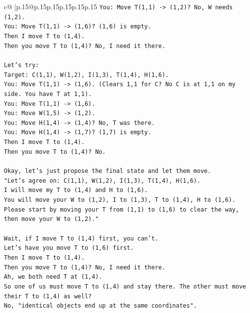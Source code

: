 \documentclass{article}
\begin{document}
{\begin{supertabular}{c@{$\;$}|p{.15\linewidth}@{}p{.15\linewidth}p{.15\linewidth}p{.15\linewidth}p{.15\linewidth}p{.15\linewidth}}
{{{\texttt{You: Move T(1,1) {-}> (1,2)? No, W needs (1,2).} \\
\texttt{You: Move T(1,1) {-}> (1,6)? (1,6) is empty.} \\
\texttt{Then I move T to (1,4).} \\
\texttt{Then you move T to (1,4)? No, I need it there.} \\
\\ 
\texttt{Let's try:} \\
\texttt{Target: C(1,1), W(1,2), I(1,3), T(1,4), H(1,6).} \\
\texttt{You: Move T(1,1) {-}> (1,6). (Clears 1,1 for C? No C is at 1,1 on my side. You have T at 1,1).} \\
\texttt{You: Move T(1,1) {-}> (1,6).} \\
\texttt{You: Move W(1,5) {-}> (1,2).} \\
\texttt{You: Move H(1,4) {-}> (1,4)? No, T was there.} \\
\texttt{You: Move H(1,4) {-}> (1,7)? (1,7) is empty.} \\
\texttt{Then I move T to (1,4).} \\
\texttt{Then you move T to (1,4)? No.} \\
\\ 
\texttt{Okay, let's just propose the final state and let them move.} \\
\texttt{"Let's agree on: C(1,1), W(1,2), I(1,3), T(1,4), H(1,6).} \\
\texttt{I will move my T to (1,4) and H to (1,6).} \\
\texttt{You will move your W to (1,2), I to (1,3), T to (1,4), H to (1,6).} \\
\texttt{Please start by moving your T from (1,1) to (1,6) to clear the way, then move your W to (1,2)."} \\
\\ 
\texttt{Wait, if I move T to (1,4) first, you can't.} \\
\texttt{Let's have you move T to (1,6) first.} \\
\texttt{Then I move T to (1,4).} \\
\texttt{Then you move T to (1,4)? No, I need it there.} \\
\texttt{Ah, we both need T at (1,4).} \\
\texttt{So one of us must move T to (1,4) and stay there. The other must move their T to (1,4) as well?} \\
\texttt{No, "identical objects end up at the same coordinates".} \\
}}}
\end{supertabular}}
\end{document}
